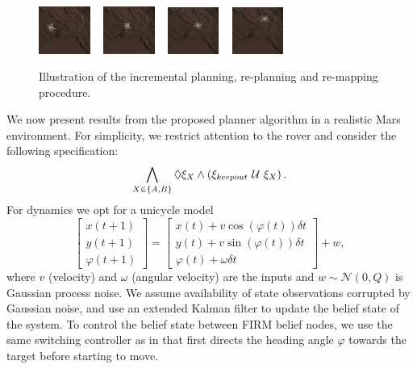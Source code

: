 \documentclass[conference]{IEEEtran}
\begin{document}
\begin{figure}[t!]
{		\includegraphics[width=0.15\textwidth]{figs/pdf4.png} ~ \includegraphics[width=0.15\textwidth]{figs/pdf5.png} ~ \includegraphics[width=0.15\textwidth]{figs/pdf6.png} ~ \includegraphics[width=0.15\textwidth]{figs/pdf7.png} 
	}
	\caption{Illustration of the incremental planning, re-planning and re-mapping procedure.}
	\label{fig:simulation}
\end{figure}

We now present results from the proposed planner algorithm in a realistic Mars environment. For simplicity, we restrict attention to the rover and consider the following specification:
\begin{equation}
    \bigwedge_{X \in \{A,B \}} \lozenge \xi_X \land \left( \xi_{keepout} \ \mathcal{U}\  \xi_X \right).
\end{equation}
For dynamics we opt for a unicycle model
\begin{equation}
    \begin{bmatrix}
        x(t+1) \\
        y(t+1) \\
        \varphi(t+1)
    \end{bmatrix} = \begin{bmatrix}x(t) + v \cos(\varphi(t)) \delta{t}\\ y(t) + v \sin(\varphi(t)) \delta{t}\\ \varphi(t) + \omega \delta{t} \end{bmatrix} + w,
\end{equation}
where $v$ (velocity) and $\omega$ (angular velocity) are the inputs and $w \sim \mathcal N(0, Q)$ is Gaussian process noise. We assume availability of state observations corrupted by Gaussian noise, and use an extended Kalman filter to update the belief state of the system. To control the belief state between FIRM belief nodes, we use the same switching controller as in \cite{Cristi-CDC-2016} that first directs the heading angle $\varphi$ towards the target before starting to move. 
\end{document}
